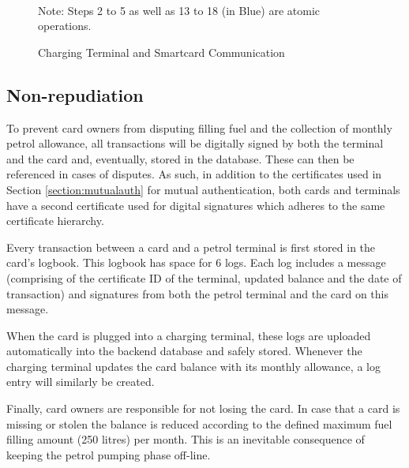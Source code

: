 \documentclass[a4paper,10pt]{llncs}
\begin{document}
\begin{figure}[h!]
\\Note: Steps 2 to 5 as well as 13 to 18 (in Blue) are atomic operations.
\caption{\label{figure:charging}Charging Terminal and Smartcard Communication}
\end{figure}



\subsection{Non-repudiation}
\label{subsection:nonrepud}
To prevent card owners from disputing filling fuel and the collection of monthly petrol allowance, all transactions will be digitally signed by both the terminal and the card and, eventually, stored in the database. These can then be referenced in cases of disputes. As such, in addition to the certificates used in Section \ref{section:mutualauth} for mutual authentication, both cards and terminals have a second certificate used for digital signatures which adheres to the same certificate hierarchy.

Every transaction between a card and a petrol terminal is first stored in the card's logbook. This logbook has space for 6 logs. Each log includes a message (comprising of the certificate ID of the terminal, updated balance and the date of transaction) and signatures from both the petrol terminal and the card on this message.

When the card is plugged into a charging terminal, these logs are uploaded automatically into the backend database and safely stored. Whenever the charging terminal updates the card balance with its monthly allowance, a log entry will similarly be created. 

Finally, card owners are responsible for not losing the card. In case that a card is missing or stolen the balance is reduced according to the defined maximum fuel filling amount (250 litres) per month. This is an inevitable consequence of keeping the petrol pumping phase off-line.
\end{document}
